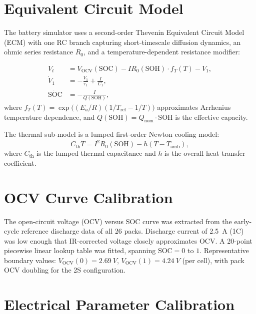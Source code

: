 \label{chap.4}

\section{Equivalent Circuit Model}

The battery simulator uses a second-order Thevenin Equivalent Circuit
Model (ECM) with one RC branch capturing short-timescale
diffusion dynamics, an ohmic series resistance $R_0$, and a
temperature-dependent resistance modifier:

\begin{align}
  V_t &= V_{\mathrm{OCV}}(\mathrm{SOC}) - I R_0(\mathrm{SOH})
         \cdot f_T(T) - V_1, \label{eq:terminal_voltage} \\
  \dot{V}_1 &= -\frac{V_1}{\tau_1} + \frac{I}{C_1},
  \label{eq:rc_dynamics} \\
  \dot{\mathrm{SOC}} &= -\frac{I}{Q(\mathrm{SOH})},
  \label{eq:soc_dynamics}
\end{align}
where $f_T(T) = \exp\bigl((E_a/R) (1/T_{\mathrm{ref}} - 1/T)\bigr)$
approximates Arrhenius temperature dependence, and
$Q(\mathrm{SOH}) = Q_{\mathrm{nom}} \cdot \mathrm{SOH}$ is the
effective capacity.

The thermal sub-model is a lumped first-order Newton cooling model:
\begin{equation}
  C_{\mathrm{th}} \dot{T} = I^2 R_0(\mathrm{SOH}) - h(T - T_{\mathrm{amb}}),
  \label{eq:thermal_model}
\end{equation}
where $C_{\mathrm{th}}$ is the lumped thermal capacitance and $h$ is
the overall heat transfer coefficient.

\section{OCV Curve Calibration}

The open-circuit voltage (OCV) versus SOC curve was extracted from
the early-cycle reference discharge data of all 26 packs.
Discharge current of \SI{2.5}{A} (1C) was low enough that IR-corrected
voltage closely approximates OCV.  A 20-point piecewise linear lookup
table was fitted, spanning $\mathrm{SOC} = 0$ to $1$.  Representative
boundary values: $V_{\mathrm{OCV}}(0) = \SI{2.69}{V}$,
$V_{\mathrm{OCV}}(1) = \SI{4.24}{V}$ (per cell), with pack OCV
doubling for the 2S configuration.

\section{Electrical Parameter Calibration}

